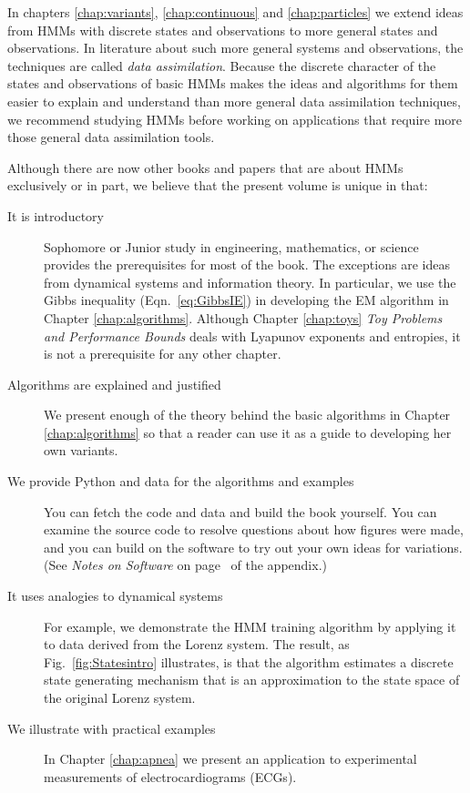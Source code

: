 \documentclass[ltxbook, commentsvisible]{hmmdsbook}
\begin{document}
In chapters \ref{chap:variants}, \ref{chap:continuous} and
\ref{chap:particles} we extend ideas from HMMs with discrete states
and observations to more general states and observations.  In
literature about such more general systems and observations, the
techniques are called \emph{data assimilation}.  Because the discrete
character of the states and observations of basic HMMs makes the ideas
and algorithms for them easier to explain and understand than more
general data assimilation techniques, we recommend studying HMMs
before working on applications that require more those general data
assimilation tools.

Although there are now other books and papers that are about HMMs
exclusively or in part, we believe that the present volume is unique in
that:
\begin{description}
\item[It is introductory] Sophomore or Junior study in engineering,
  mathematics, or science provides the prerequisites for most of the
  book.  The exceptions are ideas from dynamical systems and
  information theory.  In particular, we use the Gibbs inequality
  (Eqn.~\eqref{eq:GibbsIE}) in developing the EM algorithm in Chapter
  \ref{chap:algorithms}.  Although Chapter \ref{chap:toys} \emph{Toy
    Problems and Performance Bounds} deals with Lyapunov exponents and
  entropies, it is not a prerequisite for any other chapter.
\item[Algorithms are explained and justified] We present enough of the
  theory behind the basic algorithms in Chapter \ref{chap:algorithms}
  so that a reader can use it as a guide to developing her own
  variants.
\item[We provide Python and data for the algorithms and examples] You
  can fetch the code and data and build the book yourself.  You can
  examine the source code to resolve questions about how figures were
  made, and you can build on the software to try out your own ideas
  for variations.  (See \emph{Notes on Software} on
  page~\pageref{cha:Software} of the appendix.)
\item[It uses analogies to dynamical systems] For example, we
  demonstrate the HMM training algorithm by applying it to data
  derived from the Lorenz system.  The result, as
  Fig.~\ref{fig:Statesintro} illustrates, is that the algorithm
  estimates a discrete state generating mechanism that is an
  approximation to the state space of the original Lorenz system.
\item[We illustrate with practical examples] In Chapter
  \ref{chap:apnea} we present an application to experimental
  measurements of electrocardiograms (ECGs).  
\end{description}
\end{document}
